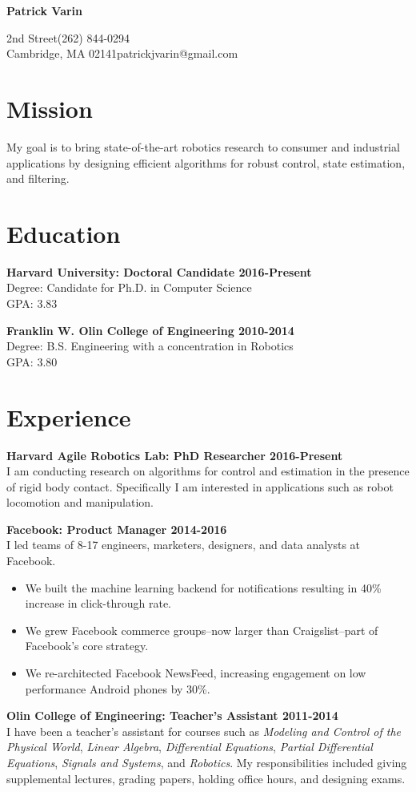 \documentclass{article}
\newcommand{\name}[1]{\begin{center}\huge\textbf{#1}\end{center}\vspace{2em}}
\newcommand{\personal}[4]{
	\noindent#1\hfill#3\\
	#2\hfill#4
}
\newcommand{\newitem}[2]{\noindent\textbf{#1 \hfill #2}\\}
\newcommand{\gimmespace}{\vspace{1em}}
\begin{document}
\name{Patrick Varin}
\personal{38 2nd Street}{Cambridge, MA 02141}{(262) 844-0294}{patrickjvarin@gmail.com}
\section*{Mission}
\noindent My goal is to bring state-of-the-art robotics research to consumer and industrial applications by designing efficient algorithms for robust control, state estimation, and filtering.

\section*{Education}
\newitem{Harvard University: Doctoral Candidate}{2016-Present}
Degree: Candidate for Ph.D. in Computer Science\\
GPA: 3.83
\gimmespace

\newitem{Franklin W. Olin College of Engineering}{2010-2014}
Degree: B.S. Engineering with a concentration in Robotics\\
GPA: 3.80

\section*{Experience}

\newitem{Harvard Agile Robotics Lab: PhD Researcher}{2016-Present}
I am conducting research on algorithms for control and estimation in the presence of rigid body contact. Specifically I am interested in applications such as robot locomotion and manipulation.
\gimmespace

\newitem{Facebook: Product Manager}{2014-2016}
I led teams of 8-17 engineers, marketers, designers, and data analysts at Facebook.
\begin{itemize}
\item We built the machine learning backend for notifications resulting in 40\% increase in click-through rate.
\item We grew Facebook commerce groups--now larger than Craigslist--part of Facebook's core strategy.
\item We re-architected Facebook NewsFeed, increasing engagement on low performance Android phones by 30\%.
\end{itemize}
\gimmespace

\newitem{Olin College of Engineering: Teacher's Assistant}{2011-2014}
I have been a teacher's assistant for courses such as \emph{Modeling and Control of the Physical World}, \emph{Linear Algebra}, \emph{Differential Equations}, \emph{Partial Differential Equations}, \emph{Signals and Systems}, and \emph{Robotics}. My responsibilities included giving supplemental lectures, grading papers, holding office hours, and designing exams.
\gimmespace
\end{document}
